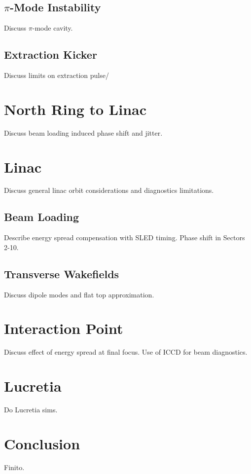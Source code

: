 \documentclass[aps,prl,preprint,groupedaddress]{revtex4-1}
\begin{document}
\subsection{$\pi$-Mode Instability}
Discuss $\pi$-mode cavity.

\subsection{Extraction Kicker}
Discuss limits on extraction pulse/

\section{North Ring to Linac}
Discuss beam loading induced phase shift and jitter.

\section{Linac}
Discuss general linac orbit considerations and diagnostics limitations.

\subsection{Beam Loading}
Describe energy spread compensation with SLED timing. Phase shift in Sectors 2-10.

\subsection{Transverse Wakefields}
Discuss dipole modes and flat top approximation.

\section{Interaction Point}
Discuss effect of energy spread at final focus. Use of ICCD for beam diagnostics.

\section{Lucretia}
Do Lucretia sims.

\section{Conclusion}
Finito.

\end{document}
